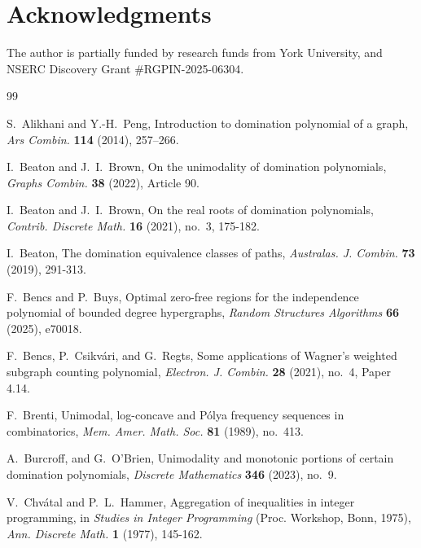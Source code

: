 \documentclass[11pt]{amsart}
\numberwithin{equation}{section}
\begin{document}
\section{Acknowledgments}
The author is partially funded by research funds from York University, and NSERC Discovery Grant \#RGPIN-2025-06304.

\begin{thebibliography}{99}

S.~Alikhani and Y.-H.~Peng,
\newblock Introduction to domination polynomial of a graph,
\newblock \emph{Ars Combin.} \textbf{114} (2014), 257--266.

I.~Beaton and J.~I.~Brown,
\newblock On the unimodality of domination polynomials,
\newblock \emph{Graphs Combin.} \textbf{38} (2022), Article 90.

I.~Beaton and J.~I.~Brown,
\newblock On the real roots of domination polynomials,
\newblock \emph{Contrib. Discrete Math.} \textbf{16} (2021), no.~3, 175-182.

I.~Beaton,
\newblock The domination equivalence classes of paths,
\newblock \emph{Australas. J. Combin.} \textbf{73} (2019), 291-313.

F.~Bencs and P.~Buys,
\newblock Optimal zero-free regions for the independence polynomial of bounded degree hypergraphs,
\newblock \emph{Random Structures Algorithms} \textbf{66} (2025), e70018.

F.~Bencs, P.~Csikv\'ari, and G.~Regts,
\newblock Some applications of {W}agner's weighted subgraph counting polynomial,
\newblock \emph{Electron. J. Combin.} \textbf{28} (2021), no.~4, Paper 4.14.

F.~Brenti,
\newblock Unimodal, log-concave and {P}\'olya frequency sequences in combinatorics,
\newblock \emph{Mem. Amer. Math. Soc.} \textbf{81} (1989), no.~413.

A.~Burcroff, and G.~O'Brien,
\newblock Unimodality and monotonic portions of certain domination polynomials,
\newblock \emph{Discrete Mathematics} \textbf{346} (2023), no.~9.

V.~Chv\'atal and P.~L.~Hammer,
\newblock Aggregation of inequalities in integer programming,
\newblock in \emph{Studies in Integer Programming} (Proc. Workshop, Bonn, 1975),
\newblock \emph{Ann. Discrete Math.} \textbf{1} (1977), 145-162.


\end{thebibliography}
\end{document}
